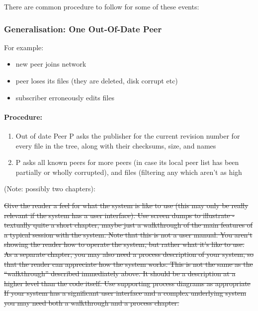 \documentclass[12pt,a4paper,]{adreport}
\begin{document}
There are common procedure to follow for some of these events:

\subsubsection{Generalisation: One Out-Of-Date
Peer}\label{generalisation-one-out-of-date-peer}

For example:

\begin{itemize}
\itemsep1pt\parskip0pt
\item
  new peer joins network
\item
  peer loses its files (they are deleted, disk corrupt etc)
\item
  subscriber erroneously edits files
\end{itemize}

\paragraph{Procedure:}\label{procedure}

\begin{enumerate}
\def\labelenumi{\arabic{enumi}.}
\itemsep1pt\parskip0pt
\item
  Out of date Peer P asks the publisher for the current revision number
  for every file in the tree, along with their checksums, size, and
  names
\item
  P asks all known peers for more peers (in case its local peer list has
  been partially or wholly corrupted), and files (filtering any which
  aren't as high
\end{enumerate}

(Note: possibly two chapters):

\sout{Give the reader a feel for what the system is like to use (this
may only be really relevant if the system has a user interface). Use
screen dumps to illustrate - textually quite a short chapter, maybe just
a walkthrough of the main features of a typical session with the system.
Note that this is not a user manual. You aren't showing the reader how
to operate the system, but rather what it's like to use. As a separate
chapter, you may also need a process description of your system, so that
the reader can appreciate how the system works. This is not the same as
the ``walkthrough'' described immediately above. It should be a
description at a higher level than the code itself. Use supporting
process diagrams as appropriate If your system has a significant user
interface and a complex underlying system you may need both a
walkthrough and a process chapter.}
\end{document}
